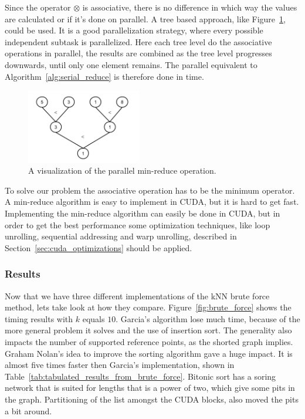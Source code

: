 Since the operator $\otimes$ is associative, there is no difference in which way the values are calculated or if it's done on parallel. A tree based approach, like Figure~\ref{fig:paralell_reduce_operation}, could be used. It is a good parallelization strategy, where every possible independent subtask is parallelized. Here each tree level do the associative operations in parallel, the results are combined as the tree level progresses downwards, until only one element remains. The parallel equivalent to Algorithm~\ref{alg:serial_reduce} is therefore done in  time. 

\begin{figure}[ht!]
\centering
\includegraphics[width=50mm]{../gfx/min_reduce.png}

\caption{A visualization of the parallel min-reduce operation.}
\label{fig:paralell_reduce_operation}
\end{figure}

To solve our problem the associative operation has to be the minimum operator. A min-reduce algorithm is easy to implement in CUDA, but it is hard to get fast. Implementing the min-reduce algorithm can easily be done in CUDA, but in order to get the best performance some optimization techniques, like loop unrolling, sequential addressing and warp unrolling, described in Section~\ref{sec:cuda_optimizations} should be applied.   

\subsubsection{Results} %
\label{ssub:comparison}

Now that we have three different implementations of the kNN brute force method, lets take look at how they compare. Figure~\ref{fig:brute_force} shows the timing results with $k$ equals $10$. Garcia's algorithm lose much time, because of the more general problem it solves and the use of insertion sort. The generality also impacts the number of supported reference points, as the shorted graph implies. Graham Nolan's idea to improve the sorting algorithm gave a huge impact. It is almost five times faster then Garcia's implementation, shown in Table~\ref{tab:tabulated_results_from_brute_force}. Bitonic sort has a soring network that is suited for lengths that is a power of two, which give some pits in the graph. Partitioning of the list amongst the CUDA blocks, also moved the pits a bit around.  

